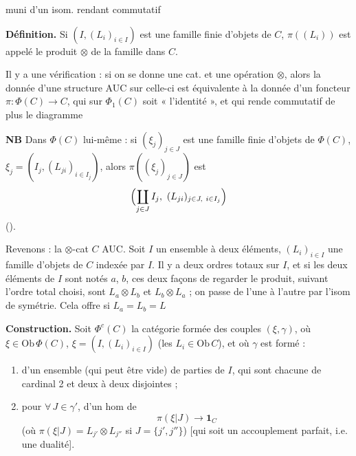 \documentclass[11pt,a4paper]{article}
\begin{document}
muni d'un isom. rendant commutatif 

\textbf{Définition.} Si $(I, (L_i)_{i\in I})$ est une famille finie
d'objets de $C$, $\pi((L_i))$ est appelé le produit $\otimes$ de la famille
dans $C$.

Il y a une vérification : si on se donne une cat. et une opération
$\otimes$, alors la donnée d'une structure AUC sur celle-ci est équivalente
à la donnée d'un foncteur $\pi : \Phi(C) \to C$,  qui sur $\Phi_1(C)$ soit « l'identité », et qui
rende commutatif de plus le diagramme


\textbf{NB} Dans $\Phi(C)$ lui-même : si $(\xi_j)_{j\in J}$ est une famille
finie d'objets de $\Phi(C)$, $\xi_j = (I_j, (L_{ji})_{i \in I_j})$, alors
$\pi((\xi_j)_{j\in J})$ est
\[
\Bigl(\coprod_{j\in J} I_j,\ (L_{ji})_{j\in J,\ i\in I_j}\Bigr)
\]
().

Revenons : la $\otimes$-cat $C$ AUC. Soit $I$ un ensemble à deux éléments,
$(L_i)_{i\in I}$ une famille d'objets de $C$ indexée par $I$. Il y a deux
ordres totaux sur $I$, et si les deux éléments de $I$ sont notés $a$, $b$,
ces deux façons de regarder le produit, suivant l'ordre total choisi, sont
$L_a \otimes L_b$ et $L_b \otimes L_a$ ; on passe de l'une à l'autre par
l'isom de symétrie. Cela offre  si $L_a = L_b = L$

\textbf{Construction.} Soit $\Phi^{c}(C)$ la catégorie formée des
 couples $(\xi, \gamma)$, où $\xi \in \mathrm{Ob}\,\Phi(C)$,
$\xi = (I, (L_i)_{i\in I})$ (les $L_i \in \mathrm{Ob}\,C$), et où $\gamma$
est formé :

\begin{enumerate}
\item d'un ensemble  (qui peut être vide) de parties
de $I$, qui sont chacune de cardinal 2 et deux à deux disjointes ;
\item pour $\forall\, J \in \gamma'$, d'un hom de
\[
\pi(\xi|J) \longrightarrow \mathbf{1}_C
\]
(où $\pi(\xi|J) = L_{j'} \otimes L_{j''}$ si $J = \{j', j''\}$)
[qui soit un accouplement parfait, i.e. une dualité].
\end{enumerate}
\end{document}
